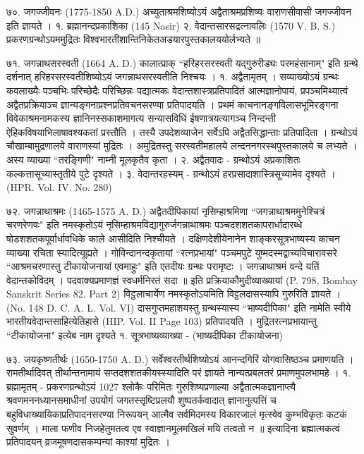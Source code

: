 ७०. जगज्जीवनः (1775-1850 A.D.)
अच्युताश्रमशिष्योऽयं अद्वैताश्रमप्रशिष्यः वाराणसीवासी जगज्जीवन इति ज्ञायते ।
१. ब्रह्मानन्दप्रकाशिका (145 Nasir)
२. वेदान्तसारसद्रत्नावलिः (1570 V. B. S.)
प्रकरणग्रन्थोऽयममुद्रितः विश्वभारतीशान्तिनिकेतअडयारपुस्तकालययोर्लभ्यते ॥

७१. जगन्नाथसरस्वती (1664 A. D.) कालात्प्राक् 
``हरिहरसरस्वती यद्गुरुरीड्यः परमहंसानाम्" इति ग्रन्थे दर्शनात् हरिहरसरस्वतीशिष्योऽयं जगन्नाथसरस्वतीति निश्चयः ।
१. अद्वैतामृतम् ।
सव्याख्योऽयं ग्रन्थः कवलाख्यैः पञ्चभिः परिच्छेदैः परिच्छिन्नः पद्यात्मकः वेदान्तशास्त्रप्रतिपादितं आत्मज्ञानोपायं, प्रपञ्चमिथ्यात्वं अद्वैतप्रक्रियाञ्च ज्ञान्यङ्गनाप्रश्नप्रतिवचनसरण्या प्रतिपादयति । प्रथमं काचनानङ्गविलासभूमिरङ्गना विवेकाश्रमनामकस्य ज्ञानिनस्सकाशमागत्य सन्यासविधिं ईषणात्रयत्यागञ्च निन्दन्ती ऐहिकविषयाभिलाषावश्यकतां प्रस्तौति । तस्यै उपदेशव्याजेन सर्वेऽपि अद्वैतसिद्धान्ताः प्रतिपादिता । ग्रन्थोऽयं चौखाम्बामुद्रणालये वाराणस्यां मुद्रितः । अमुद्रितस्तु सरस्वतीमहालये लन्दननगरस्थपुस्तकालये च लभ्यते । अस्य व्याख्या ``तरङ्गिणी" नाम्नी मूलकृतैव कृता ।
२. अद्वैतवादः - ग्रन्थोऽयं अप्रकाशितः कल्कत्तासूच्यास्तृतीये पुटे दृश्यते ।
३. वेदान्तरहस्यम् - ग्रन्थोऽयं हरप्रसादाशास्त्रिसूच्यामेव दृश्यते । (HPR. Vol. IV. No. 280)

७२. जगन्नाथाश्रमः (1465-1575 A. D.)
अद्वैतदीपिकायां नृसिम्हाश्रमिणा ``जगन्नाथाश्रममुनेश्चित्रं चरणरेणवः" इति नमस्कृतोऽयं नृसिम्हाश्रमविद्यागुरुर्जगन्नाथाश्रमः पञ्चदशशतकापरार्धादारब्धे षोडशशतकपूर्वार्धावधिके काले आसीदिति निश्चीयते । दक्षिणदेशीयेनानेन शाङ्करसूत्रभाष्यस्य काचन व्याख्या रचिता स्यादित्यूह्यते । गोविन्दानन्दकृतायां ``रत्नप्रभायां" पञ्चमपुटे युष्मदस्मद्वाच्यविचारावसरे ``आश्रमचरणास्तु टीकायोजनायां एवमाहुः" इति एतदीयः ग्रन्थः परामृष्टः ।
जगन्नाथाश्रमं वन्दे यतिं वेदान्तकोविदम् ।
पदवाक्यप्रमाणज्ञं स्वधर्मनिरतं सदा ॥
इति प्रक्रियाकौमुदीव्याख्यायां (P. 798, Bombay Sanskrit Series 82. Part 2) विट्ठलाचार्येण नमस्कृतोऽयमिति विट्टलदासस्यापि गुरुरिति ज्ञायते । (No. 148 D. C. A. L. Vol. VI) 
दासगुप्तमहाशयस्तु ग्रन्थस्यास्य ``भाष्यदीपिका" इति नामेति स्वीये भारतीयवेदान्तसाहित्येतिहासे (HIP. Vol. II Page 103) प्रतिपादयति । मुद्रितरत्नप्रभायान्तु ``टीकायोजना" इत्येब नाम दृश्यते 
१. सूत्रभाष्यव्याख्या - (भाष्यदीपिका टीकायोजना)

७३. जयकृष्णतीर्थः (1650-1750 A. D.)
सर्वेश्वरतीर्थशिष्योऽयं आनन्दगिरिं योगवासिष्ठञ्च प्रमाणयति । रामतीर्थादिवत् तीर्थान्तनामायं सप्तदशशतकीयस्स्यादिति परं ज्ञायते नान्यत्प्रबलतरं प्रमाणमुपलभामहे ।
१. ब्रह्मामृतम् - प्रकरणग्रन्थोऽयं 1027 श्लोकैः परिमितः गुरुशिष्यप्रणाल्या अद्वैतात्मकज्ञानाप्त्यै श्रवणमननध्यानसमाधीनां उपयोगं जगतस्सृष्टिप्रलयौ शुष्पतर्कवादात् ज्ञानानुत्पत्तिं च बहुविधाख्यायिकाप्रतिपादनसरण्या निरूपयन्
आत्मैव सर्वमिदमस्य विकारजालं मृत्स्वेव कुम्भविकृतः कटकं सुवर्णम् ।
माला फणीव निजहेतुमतत्व एव स्वाज्ञानमूलमखिलं मयि तत्वतो न ॥
इत्यादिना ब्रह्मात्मकत्वं प्रतिपादयन् व्रजमूषणदासकम्पन्यां काश्यां मुद्रितः ।

